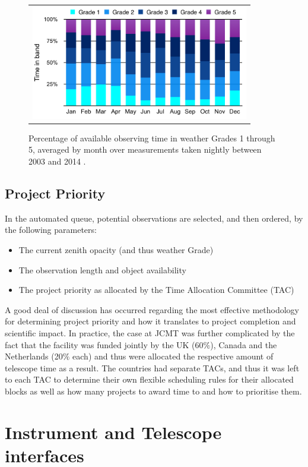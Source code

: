 \documentclass[]{spie}  %
\begin{document}
  \begin{figure}[h]
   \begin{center}
   \begin{tabular}{c}
   \includegraphics[height=5cm]{tauaverageperc.png}
   \end{tabular}
   \end{center}
   \caption{\label{fig:tau} Percentage of available observing time in weather Grades 1 through 5, averaged by month over measurements taken nightly between 2003 and 2014 .}
\end{figure}

\subsection{Project Priority}
In the automated queue, potential observations are selected, and then
ordered, by the following parameters:
\begin{itemize}
\item The current zenith opacity (and thus weather Grade)
\item The observation length and object availability
\item The project priority as allocated by the Time Allocation Committee (TAC)
\end{itemize}

A good deal of discussion has occurred regarding the most effective
methodology for determining project priority and how it translates to
project completion and scientific impact\cite{adamson2004,robson2002}.
In practice, the case at JCMT was further complicated by the fact that
the facility was funded jointly by the UK (60$\%$), Canada and the
Netherlands (20$\%$ each) and thus were allocated the respective
amount of telescope time as a result. The countries had separate TACs,
and thus it was left to each TAC to determine their own flexible
scheduling rules for their allocated blocks as well as how many
projects to award time to and how to prioritise them.

\section{Instrument and Telescope interfaces}\label{sec:inst}
\end{document}
